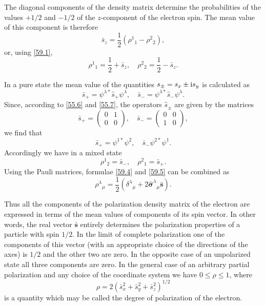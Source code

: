 The diagonal components of the density matrix determine the probabilities of the values $ +1/2 $ and $ -1/2 $ of the $ z $-component of the electron spin. The mean value of this component is therefore
\[ \bar{s}_z=\frac{1}{2}(\rho^1{}_1-\rho^2{}_2), \]
or, using \eqref{59.1},
\begin{equation}\label{59.4}
\rho^1{}_1=\frac{1}{2}+\bar{s}_z,\quad\rho^2{}_2=\frac{1}{2}-\bar{s}_z.
\end{equation}


In a pure state the mean value of the quantities $ s_\pm = s_x \pm \mathrm{i} s_y $ is calculated as
\[ \bar{s}_+=\psi^{\lambda*}\hat{s}_+\psi^\lambda,\quad\bar{s}_-=\psi^{\lambda*}\hat{s}_-\psi^\lambda. \]
Since, according to \eqref{55.6} and \eqref{55.7}, the operators $\hat{s}_\pm$ are given by the matrices
\[ \bar{s}_+=\left(\begin{array}{cc}
0&1\\
0&0
\end{array}\right),\quad\bar{s}_-=\left( \begin{array}{cc}
0&0\\
1&0
\end{array}\right), \]
we find that
\[ \bar{s}_+=\psi^{1*}\psi^2,\quad\bar{s}_-\psi^{2*}\psi^1. \]
Accordingly we have in a mixed state
\begin{equation}\label{59.5}
\rho^1{}_2=\bar{s}_-,\quad\rho^2{}_1=\bar{s}_+.
\end{equation}
Using the Pauli matrices, formulae \eqref{59.4} and \eqref{59.5} can be combined as
\begin{equation}\label{59.6}
\rho^\lambda{}_{\mu}=\frac{1}{2}(\delta^\lambda{}_\mu+2\hat{\bm{\sigma}}^\lambda{}_\mu\bar{\bm{s}}).
\end{equation}


Thus all the components of the polarization density matrix of the electron are expressed in terms of the mean values of components of its spin vector. In other words, the real vector $ \bar{\bm{s}} $ entirely determines the polarization properties of a particle with spin $ 1/2 $. In the limit of complete polarization one of the components of this vector (with an appropriate choice of the directions of the axes) is $ 1/2 $ and the other two are zero. In the opposite case of an unpolarized state all three components are zero. In the general case of an arbitrary partial polarization and any choice of the coordinate system we have $ 0\leqslant\rho\leqslant1 $, where
\[ \rho=2(\bar{s}_x^2+\bar{s}_y^2+\bar{s}_z^2)^{1/2} \]
is a quantity which may be called the degree of polarization of the electron.

